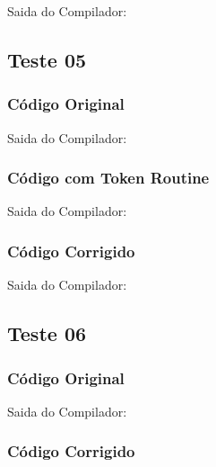 Saida do Compilador:




\subsection{Teste 05}
\label{subsec:sintaticoTeste05}

\subsubsection{Código Original}


Saida do Compilador:




\subsubsection{Código com Token Routine}


Saida do Compilador:





\subsubsection{Código Corrigido}


Saida do Compilador:




\subsection{Teste 06}
\label{subsec:sintaticoTeste06}

\subsubsection{Código Original}


Saida do Compilador:




\subsubsection{Código Corrigido}


